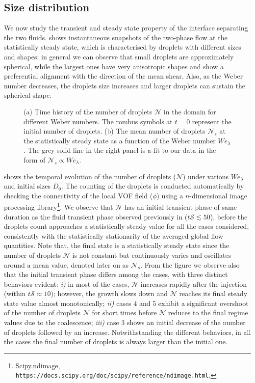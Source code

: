 \subsection{Size distribution}
We now study the transient and steady state property of the interface separating the two fluids.  shows instantaneous snapshots of the two-phase flow at the statistically steady state, which is characterised by droplets with different sizes and shapes: in general we can observe that small droplets are approximately spherical, while the largest ones have very anisotropic shapes and show a preferential alignment with the direction of the mean shear. Also, as the Weber number decreases, the droplets size increases and larger droplets can sustain the spherical shape.

\begin{figure}
	\centering
	 \hspace{0.5cm}
	 \vspace{0.5cm}
	\caption{(a) Time history of the number of droplets $\mathcal{N}$ in the domain for different Weber numbers. The rombus symbols at $t=0$ represent the initial number of droplets. (b) The mean number of droplets $\mathcal{N}_s$ at the statistically steady state as a function of the Weber number $We_\lambda$. The grey solid line in the right panel is a fit to our data in the form of $\mathcal{N}_s \propto We_\lambda$.}
	\label{fig:count}
\end{figure}

 shows the temporal evolution of the number of droplets ($\mathcal{N}$) under various $We_\lambda$ and initial sizes $D_0$. The counting of the droplets is conducted automatically by checking the connectivity of the local VOF field ($\phi$) using a $n$-dimensional image processing library\footnote{Scipy.ndimage, \texttt{https://docs.scipy.org/doc/scipy/reference/ndimage.html}.}. We observe that $\mathcal{N}$ has an initial transient phase of same duration as the fluid transient phase observed previously in  ($t\mathcal{S} \lesssim 50$), before the droplets count approaches a statistically steady value for all the cases considered, consistently with the statistically stationarity of the averaged global flow quantities. Note that, the final state is a statistically steady state since the number of droplets $\mathcal{N}$ is not constant but continuously varies and oscillates around a mean value, denoted later on as $\mathcal{N}_s$. From the figure we observe also that the initial transient phase differs among the cases, with three distinct behaviors evident: \textit{i)} in most of the cases, $\mathcal{N}$ increases rapidly after the injection (within $t \mathcal{S} \approx 10$); however, the growth slows down and $\mathcal{N}$ reaches its final steady state value almost monotonically; \textit{ii)} cases $4$ and $5$ exhibit a significant overshoot of the number of droplets $\mathcal{N}$ for short times before $\mathcal{N}$ reduces to the final regime values due to the coalescence; \textit{iii)} case $3$ shows an initial decrease of the number of droplets followed by an increase. Notwithstanding the different behaviors, in all the cases the final number of droplets is always larger than the initial one. 

